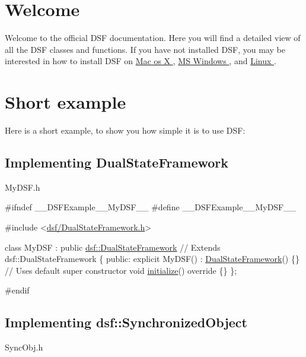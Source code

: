 \hypertarget{index_welcome}{}\section{Welcome}\label{index_welcome}
Welcome to the official D\+S\+F documentation. Here you will find a detailed view of all the D\+S\+F classes and functions. If you have not installed D\+S\+F, you may be interested in how to install D\+S\+F on \hyperlink{_mac}{Mac os X }, \hyperlink{_win}{M\+S Windows }, and \hyperlink{_linux}{Linux }.\hypertarget{index_example}{}\section{Short example}\label{index_example}
Here is a short example, to show you how simple it is to use D\+S\+F\+: \hypertarget{index_dsf}{}\subsection{Implementing Dual\+State\+Framework}\label{index_dsf}
My\+D\+S\+F.\+h 
\begin{DoxyCodeInclude}
\textcolor{preprocessor}{#ifndef \_\_DSFExample\_\_MyDSF\_\_}
\textcolor{preprocessor}{#define \_\_DSFExample\_\_MyDSF\_\_}

\textcolor{preprocessor}{#include <\hyperlink{_dual_state_framework_8h}{dsf/DualStateFramework.h}>}

\textcolor{keyword}{class }MyDSF : \textcolor{keyword}{public} \hyperlink{classdsf_1_1_dual_state_framework}{dsf::DualStateFramework} \textcolor{comment}{// Extends dsf::DualStateFramework}
\{
\textcolor{keyword}{public}:
    \textcolor{keyword}{explicit} MyDSF() : \hyperlink{namespacedsf_a68ac3b6a0526bfa7f6a412918afb1841}{DualStateFramework}() \{\} \textcolor{comment}{// Uses default super constructor}
    \textcolor{keywordtype}{void} \hyperlink{classdsf_1_1_dual_state_framework_a809a7bba4148e17ea9a43a0a035383ba}{initialize}()\textcolor{keyword}{ override }\{\}
\};

\textcolor{preprocessor}{#endif}
\end{DoxyCodeInclude}
\hypertarget{index_syncObj}{}\subsection{Implementing dsf\+::\+Synchronized\+Object}\label{index_syncObj}
Sync\+Obj.\+h 
